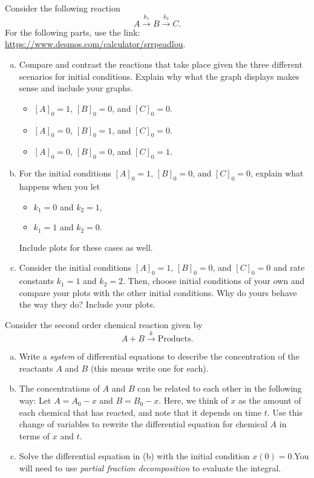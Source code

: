 \begin{problem}
Consider the following reaction
\[
A \xrightarrow{k_1} B \xrightarrow{k_2} C.
\]
For the following parts, use the link: \url{https://www.desmos.com/calculator/srrpeadlou}.
\begin{enumerate}[(a)]
    \item Compare and contrast the reactions that take place given the three different scenarios for initial conditions. Explain why what the graph displays makes sense and include your graphs.
    \begin{itemize}
        \item $[A]_0 = 1$, $[B]_0=0$, and $[C]_0 =0$.
        \item $[A]_0 = 0$, $[B]_0=1$, and $[C]_0 =0$.
        \item $[A]_0 = 0$, $[B]_0=0$, and $[C]_0 =1$.
    \end{itemize}
    \item For the initial conditions $[A]_0 = 1$, $[B]_0=0$, and $[C]_0 =0$, explain what happens when you let
    \begin{itemize}
        \item $k_1=0$ and $k_2=1$,
        \item $k_1=1$ and $k_2=0$.
    \end{itemize}
    Include plots for these cases as well.
    \item Consider the initial conditions $[A]_0 = 1$, $[B]_0=0$, and $[C]_0 =0$ and rate constants $k_1=1$ and $k_2=2$. Then, choose initial conditions of your own and compare your plots with the other initial conditions. Why do yours behave the way they do? Include your plots.
\end{enumerate}
\end{problem}

\begin{problem}
Consider the second order chemical reaction given by
\[
A+B \xrightarrow{k} \textrm{Products}.
\]
\begin{enumerate}[(a)]
    \item Write a \emph{system} of differential equations to describe the concentration of the reactants $A$ and $B$ (this means write one for each).
    \item The concentrations of $A$ and $B$ can be related to each other in the following way: Let $A=A_0-x$ and $B=B_0-x$. Here, we think of $x$ as the amount of each chemical that has reacted, and note that it depends on time $t$. Use this change of variables to rewrite the differential equation for chemical $A$ in terms of $x$ and $t$.
    \item Solve the differential equation in (b) with the initial condition $x(0)=0$.You will need to use \emph{partial fraction decomposition} to evaluate the integral.
\end{enumerate}
\end{problem}

